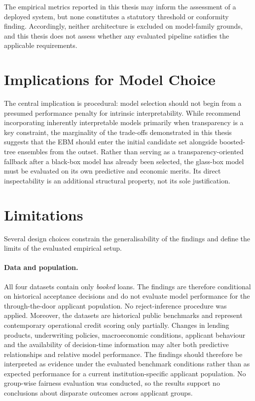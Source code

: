 The empirical metrics reported in this thesis may inform the assessment of a
deployed system, but none constitutes a statutory threshold or conformity finding.
Accordingly, neither architecture is excluded on model-family grounds, and this
thesis does not assess whether any evaluated pipeline satisfies the applicable
requirements.

\section{Implications for Model Choice}

The central implication is procedural: model selection should not begin from a
presumed performance penalty for intrinsic interpretability. While 
\citet{amekoeExploringAccuracyInterpretability2024b} recommend incorporating inherently 
interpretable models primarily when transparency is a key constraint, the marginality of 
the trade-offs demonstrated in this thesis suggests that the EBM should enter the 
initial candidate set alongside boosted-tree ensembles from the outset. Rather than 
serving as a transparency-oriented fallback after a black-box model has already 
been selected, the glass-box model must be evaluated on its own predictive and 
economic merits. Its direct inspectability is an additional structural property, 
not its sole justification.


\section{Limitations}\label{sec:limitations}

Several design choices constrain the generalisability of the findings and define
the limits of the evaluated empirical setup.

\paragraph{Data and population.}
All four datasets contain only \emph{booked} loans. The findings are therefore
conditional on historical acceptance decisions and do not evaluate model performance
for the through-the-door applicant population. No reject-inference procedure was
applied. Moreover, the datasets are historical public benchmarks and represent
contemporary operational credit scoring only partially. Changes in lending products,
underwriting policies, macroeconomic conditions, applicant behaviour and the
availability of decision-time information may alter both predictive relationships and
relative model performance. The findings should therefore be interpreted as evidence
under the evaluated benchmark conditions rather than as expected performance for a
current institution-specific applicant population. No group-wise fairness evaluation was conducted, so the results support no conclusions
about disparate outcomes across applicant groups.

